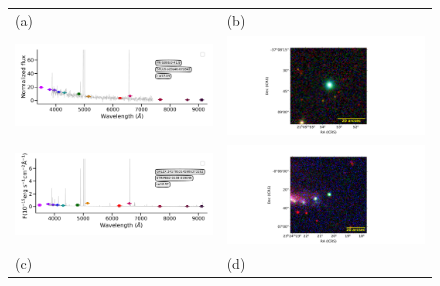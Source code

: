 \documentclass[fleqn,usenatbib]{mnras}
\begin{document}
\begin{figure}
  \setlength\tabcolsep{0pt}
  \begin{tabular}{ll}
    (a) & (b) \\
    \includegraphics[trim=10 0 10 20, clip]{Figs/StenholmAcker_pn_g006_0-41_9_id176-SPLUS-s29s46-072842.pdf} & \includegraphics[width=0.3\linewidth, trim=10 0 65 20, clip]{Figs/PNG006_316-37_100_r.pdf} \\
     \includegraphics[trim=10 0 10 20, clip]{Figs/spec-0680-52200-0153-STRIPE82-0159-019049.pdf} & \includegraphics[width=0.3\linewidth, trim=10 0 65 20, clip]{Figs/GALEX24170_351-0_150_r.pdf} \\
    (c) & (d) \\

\end{tabular}
\end{figure}
\end{document}
